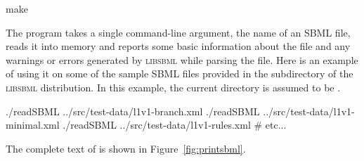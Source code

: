 \documentclass{sbmlmanual}
\newcommand{\libsbml}{\textsc{libsbml}}
\begin{document}
\begin{example}[csh]
  make
\end{example}

The  program takes a single command-line argument, the name
of an SBML file, reads it into memory and reports some basic information
about the file and any warnings or errors generated by \libsbml{} while
parsing the file.  Here is an example of using it on some of the sample
SBML files provided in the  subdirectory of the
\libsbml{} distribution.  In this example, the current directory is assumed
to be .

\begin{example}[csh]
  ./readSBML ../src/test-data/l1v1-branch.xml
  ./readSBML ../src/test-data/l1v1-minimal.xml
  ./readSBML ../src/test-data/l1v1-rules.xml
  # etc...
\end{example}


The complete text of  is shown in Figure~\vref{fig:printsbml}.
\end{document}
